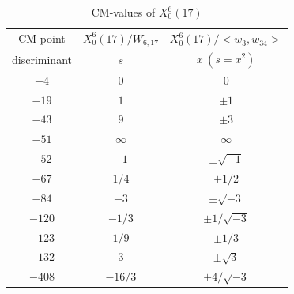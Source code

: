 \documentclass{amsart}
\theoremstyle{definition}
\begin{document}
\begin{appendices}
\begin{table}
\renewcommand{\arraystretch}{1.5}
\tabcolsep=10pt                         
\begin{tabular}{|c|c|c|}
\hline
CM-point& $X_{0}^{6}\left( 17\right) /W_{6,17}$ & $X_{0}^{6}\left( 17\right)
/<w_{3},w_{34}>$ \\ 
discriminant & $s$ & $x\ (s=x^2)$ \\ \hline
${-4}$ & $0$ & $0$ \\ 
${-19}$ & $1$ & $\pm 1$ \\ 
${-43}$ & $9$ & $\pm 3$ \\ 
${-51}$ & $\infty$ & $\infty$ \\ 
${-52}$ & $-1$ & $\pm \sqrt{-1}$ \\ 
${-67}$ & ${1}/{4}$ & $\pm {1}/{2}$ \\
${-84}$ & $-3$ & $\pm \sqrt{-3}$ \\ 
${-120}$ & $-{1}/{3}$ & $\pm 1/\sqrt{-3}$ \\ 
${-123}$ & ${1}/{9}$ & $\pm {1}/{3}$ \\ 
${-132}$ & $3$ & $\pm\sqrt{3}$ \\ 
${-408}$ & $-{16}/{3}$ & $\pm{4/\sqrt{-3}}$ \\ \hline
\end{tabular}
\bigskip
\caption{CM-values of $X^{6}_0(17)$}
\end{table}









\end{appendices}
\end{document}
